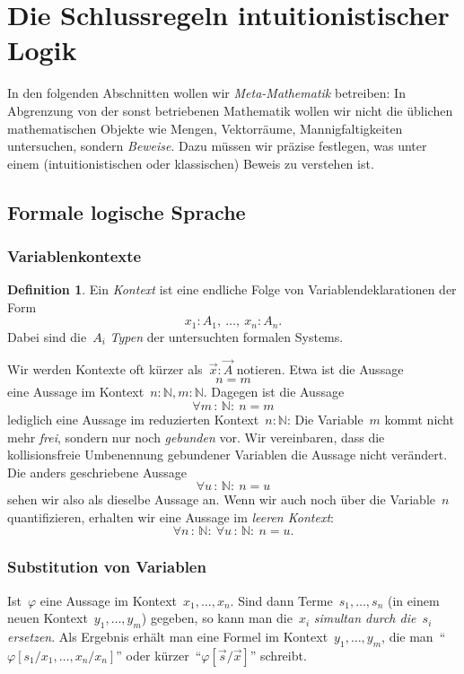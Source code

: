 \documentclass[a4paper,ngerman,12pt]{scrartcl}
\theoremstyle{definition}
\newtheorem{defn}{Definition}[section]
\theoremstyle{plain}
\theoremstyle{remark}
\newcommand{\NN}{\mathbb{N}}
\renewcommand{\_}{\mathpunct{.}\,}
\newcommand{\?}{\,{:}\,}
\begin{document}
\section{Die Schlussregeln intuitionistischer Logik}

In den folgenden Abschnitten wollen wir \emph{Meta-Mathematik} betreiben: In
Abgrenzung von der sonst betriebenen Mathematik wollen wir nicht die üblichen
mathematischen Objekte wie Mengen, Vektorräume, Mannigfaltigkeiten untersuchen,
sondern \emph{Beweise}. Dazu müssen wir präzise festlegen, was unter einem
(intuitionistischen oder klassischen) Beweis zu verstehen ist.


\subsection{Formale logische Sprache}

\subsubsection*{Variablenkontexte}

\begin{defn}Ein \emph{Kontext} ist eine endliche Folge von
Variablendeklarationen der Form
\[ x_1 : A_1,\ \ldots,\ x_n : A_n. \]
Dabei sind die~$A_i$ \emph{Typen} der untersuchten formalen Systems.\end{defn}

Wir werden Kontexte oft kürzer als~$\vec x : \vec A$ notieren. Etwa ist die
Aussage
\[ n = m \]
eine Aussage im Kontext~$n : \NN, m : \NN$. Dagegen ist die Aussage
\[ \forall m\?\NN{:}\ n = m \]
lediglich eine Aussage im reduzierten Kontext~$n : \NN$: Die Variable~$m$ kommt
nicht mehr \emph{frei}, sondern nur noch \emph{gebunden} vor. Wir vereinbaren,
dass die kollisionsfreie Umbenennung gebundener Variablen die Aussage nicht
verändert. Die anders geschriebene Aussage
\[ \forall u\?\NN{:}\ n = u \]
sehen wir also als dieselbe Aussage an.
Wenn wir auch noch über die
Variable~$n$ quantifizieren, erhalten wir eine Aussage im \emph{leeren Kontext}:
\[ \forall n\?\NN{:}\ \forall u\?\NN{:}\ n = u. \]


\subsubsection*{Substitution von Variablen}

Ist~$\varphi$ eine Aussage im Kontext~$x_1,\ldots,x_n$. Sind dann
Terme~$s_1,\ldots,s_n$ (in einem neuen Kontext~$y_1,\ldots,y_m$) gegeben, so
kann man die~$x_i$ \emph{simultan durch die~$s_i$ ersetzen}. Als Ergebnis
erhält man eine Formel im Kontext~$y_1,\ldots,y_m$, die
man~"`$\varphi[s_1/x_1,\ldots,x_n/x_n]$"' oder kürzer~"`$\varphi[\vec s/\vec
x]$"' schreibt.
\end{document}

